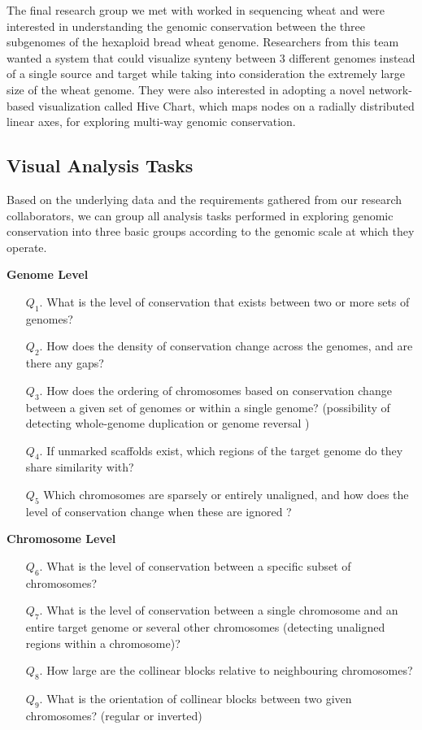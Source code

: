 The final research group we met with worked in sequencing wheat and were interested in understanding the genomic conservation between the three subgenomes of the hexaploid bread wheat genome. Researchers from this team wanted a system that could visualize synteny between 3 different genomes instead of a single source and target while taking into consideration the extremely large size of the wheat genome. They were also interested in adopting a novel network-based visualization called Hive Chart, which maps nodes on a radially distributed linear axes, for exploring multi-way genomic conservation.

\subsection{Visual Analysis Tasks}
Based on the underlying data and the requirements gathered from our research collaborators, we can group all analysis tasks performed in exploring genomic conservation into three basic groups according to the genomic scale at which they operate.

\smallskip
\noindent
\textbf{Genome Level}
\smallskip
\begin{enumerate}
\item [$Q_1$.] What is the level of conservation that exists between two or more sets of genomes?
\item [$Q_2$.] How does the density of conservation change across the genomes, and are there any gaps?
\item [$Q_3$.] How does the ordering of chromosomes based on conservation change between a given set of genomes or within a single genome? (possibility of detecting whole-genome duplication or genome reversal )
\item [$Q_4$.] If unmarked scaffolds exist, which regions of the target genome do they share similarity with?
\item[$Q_5$] Which chromosomes are sparsely or entirely unaligned, and how does the level of conservation change when these are ignored ?
\end{enumerate}

\smallskip
\noindent
\textbf{Chromosome Level}
\smallskip
\begin{enumerate}
\item [$Q_6$.]What is the level of conservation between a specific subset of chromosomes?
\item [$Q_7$.] What is the level of conservation between a single chromosome and an entire target genome or several other chromosomes (detecting unaligned regions within a chromosome)?
\item [$Q_8$.] 
How large are the collinear blocks relative to neighbouring chromosomes?
\item [$Q_9$.]What is the orientation of collinear blocks between two given chromosomes? (regular or inverted)
\end{enumerate}

